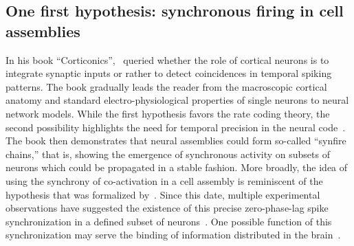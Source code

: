 \documentclass[brainsci, %
               review,submit,pdftex,moreauthors
               ]{Definitions/mdpi}
\begin{document}
\subsection{One first hypothesis: synchronous firing in cell assemblies}
%
In his book ``Corticonics'',~\citet{abeles_corticonics_1991} queried whether the role of cortical neurons is to integrate synaptic inputs or rather to detect coincidences in temporal spiking patterns. The book gradually leads the reader from the macroscopic cortical anatomy and standard electro-physiological properties of single neurons to neural network models. While the first hypothesis favors the rate coding theory, the second possibility highlights the need for temporal precision in the neural code~\citep{abeles_role_1982,paugam-moisy_computing_2012}. The book then demonstrates that neural assemblies could form so-called ``synfire chains,'' that is, showing the emergence of synchronous activity on subsets of neurons which could be propagated in a stable fashion. More broadly, the idea of using the synchrony of co-activation in a cell assembly is reminiscent of the hypothesis that was formalized by~\citet{hebb_organization_1949}. Since this date, multiple experimental observations have suggested the existence of this precise zero-phase-lag spike synchronization in a defined subset of neurons~\citep{harris_organization_2003}. One possible function of this synchronization may serve the binding of information distributed in the brain~\citep{singer_visual_1995, roelfsema_visuomotor_1997}.
\end{document}
